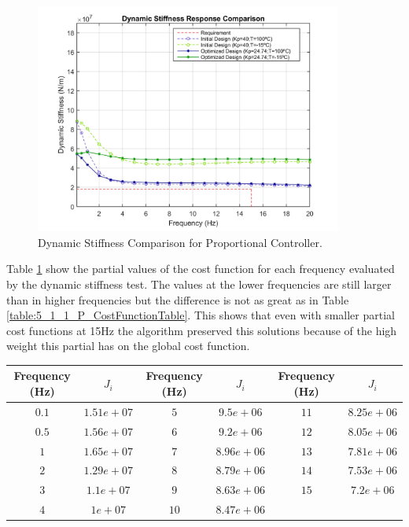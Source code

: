 \begin{figure}[H]
	\centering
	\centerline{\includegraphics[width=0.9\textwidth]{Figuras/5.OptimizationResults/5-2-1-P-DynamicStiffnessComparison.jpg}}
	\caption{Dynamic Stiffness Comparison for Proportional Controller.}
	\label{fig:5_2_1_P_DynStif}
\end{figure}

Table \ref{table:5_2_1_P_CostFunctionTable} show the partial values of the cost function for each frequency evaluated by the dynamic stiffness test. The values at the lower frequencies are still larger than in higher frequencies but the difference is not as great as in Table \ref{table:5_1_1_P_CostFunctionTable}. This shows that even with smaller partial cost functions at 15Hz the algorithm preserved this solutions because of the high weight this partial has on the global cost function.

\begin{table}[H]
	\label{table:5_2_1_P_CostFunctionTable}
	\centering
	\resizebox{14cm}{!} {
		\begin{tabular}{|c|c|c|c|c|c|}
			\hline
			Frequency (Hz) & $J_i$ & Frequency (Hz) & $J_i$ & Frequency (Hz) & $J_i$ \\ \hline
			$0.1$ & $1.51e+07$ & $5$ & $9.5e+06$ & $11$ & $8.25e+06$ \\ \hline
			$0.5$ & $1.56e+07$ & $6$ & $9.2e+06$ & $12$ & $8.05e+06$ \\ \hline
			$1$ & $1.65e+07$ & $7$ & $8.96e+06$ & $13$ & $7.81e+06$ \\ \hline
			$2$ & $1.29e+07$ & $8$ & $8.79e+06$ & $14$ & $7.53e+06$ \\ \hline
			$3$ & $1.1e+07$ & $9$ & $8.63e+06$ & $15$ & $7.2e+06$ \\ \hline
			$4$ & $1e+07$ & $10$ & $8.47e+06$ &  &  \\ \hline
	\end{tabular}}
\end{table}

